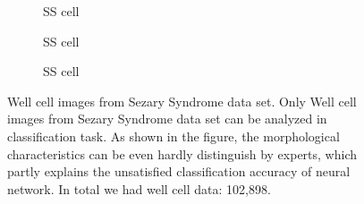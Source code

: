 \begin{figure}[ht]
\begin{center}
\begin{subfigure}[b]{0.25\textwidth}
			\label{fig:Outside FOV}
			\caption{SS cell}
		\end{subfigure}
		\begin{subfigure}[b]{0.25\textwidth}
			\label{fig:Contaminated}
			\caption{SS cell}
		\end{subfigure}
		\begin{subfigure}[b]{0.25\textwidth}
			\label{fig:Good Cell}
			\caption{SS cell}
		\end{subfigure}
		
	\end{center}
	\caption{Well cell images from Sezary Syndrome data set. Only Well cell images from Sezary Syndrome data set can be analyzed in classification task. As shown in the figure, the morphological characteristics can be even hardly distinguish by experts, which partly explains the unsatisfied classification accuracy of neural network. In total we had well cell data: 102,898.}
	\label{fig:lennas}
\end{figure}

